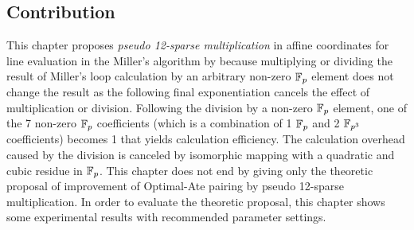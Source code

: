 \subsection{Contribution}
\label{sec:ch:icisc:contriv_outline}
This chapter proposes \textit{pseudo 12-sparse multiplication} in affine coordinates for line evaluation in the Miller's algorithm by because multiplying or dividing the result of Miller's loop calculation by an arbitrary non-zero ${\mathbb{F}}_{p}$ element does not change the result as the following final exponentiation cancels the effect of multiplication or division. 
Following the division by a non-zero ${\mathbb{F}}_{p}$ element, one of the 7 non-zero ${\mathbb{F}}_{p}$ coefficients (which is a combination of 1 ${\mathbb{F}}_{p}$ and 2 $\mathbb{F}_{p^3}$ coefficients) becomes 1 that yields calculation efficiency.
The calculation overhead caused by the division is canceled by isomorphic mapping with a quadratic and cubic residue in ${\mathbb{F}}_{p}$.
This chapter does not end by giving only the theoretic proposal of improvement of Optimal-Ate pairing by pseudo 12-sparse multiplication.
In order to evaluate the theoretic proposal, this chapter shows some experimental results with recommended parameter settings. 

